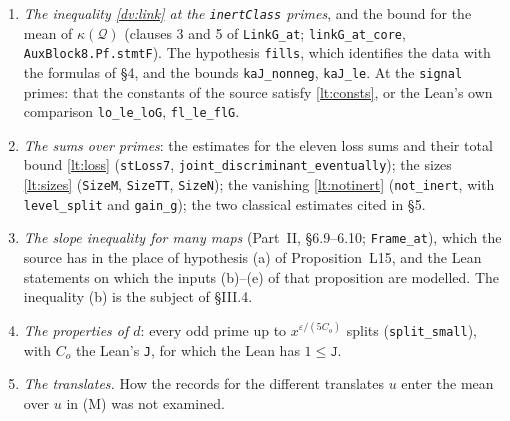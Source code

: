 \documentclass[11pt,letterpaper]{article}
\begin{document}
\begin{enumerate}[label=\textup{(\roman*)},leftmargin=2.4em]
the first clause of \texttt{LinkG\_at}; the last clause of \texttt{NuDef}, for the factor $e_w$;
\texttt{exists\_tau\_eq\_natCast} together with \texttt{fills}), and the definition \eqref{lt:N}
(\texttt{NprimeDef}). For the passage from \eqref{lt:slope} to the Lean statement \eqref{lt:Lo}: the rank
formula, the bound at the places above the level, the comparison with the first lattice of the chain
(\texttt{adm26}), the inequality of \texttt{HypLow2}, the bound $\sum_w\mathrm{sz}_w(\tau(w))\le b^2$
(\texttt{ta\_le}), and the bound for the rounding term. The last is the hypothesis \texttt{NprimeMuR} of
\texttt{places\_at\_of}; the source proves it by \texttt{linkMu} from \texttt{ZeroAbove}, from Chebyshev's
bound up to $X''$, and from bounds for $\log\mathrm{Lv}_\alpha$, $\log g_0$, $\log g_1$, $\log d$ and
$\log D_\alpha$ (\S2\,(c)), with the finite generation and the positivity of the ranks of the glued
lattices (\texttt{MuFG}, \texttt{MuRank}). That $\tau(w)=0$ above the level is the hypothesis \texttt{htauT}
of \texttt{places\_at\_of}. The archive also has a
statement \texttt{RoundingTheta}; it was not put to the dependency computation.
\item \emph{The inequality \eqref{dv:link} at the \texttt{inertClass} primes}, and the bound for the mean
of $\kappa(\mathcal Q)$ (clauses 3 and 5 of \texttt{LinkG\_at}; \texttt{linkG\_at\_core},
\texttt{AuxBlock8.Pf.stmtF}). The hypothesis \texttt{fills}, which identifies the data with the formulas of
\S4, and the bounds \texttt{kaJ\_nonneg}, \texttt{kaJ\_le}. At the \texttt{signal} primes: that the constants of the source satisfy
\eqref{lt:consts}, or the Lean's own comparison \texttt{lo\_le\_loG}, \texttt{fl\_le\_flG}.
\item \emph{The sums over primes}: the estimates for the eleven loss sums and their total bound
\eqref{lt:loss} (\texttt{stLoss7}, \texttt{joint\_discriminant\_eventually}); the sizes \eqref{lt:sizes} (\texttt{SizeM}, \texttt{SizeTT}, \texttt{SizeN});
the vanishing \eqref{lt:notinert} (\texttt{not\_inert}, with \texttt{level\_split} and \texttt{gain\_g}); the two classical estimates cited in \S5.
\item \emph{The slope inequality for many maps} (Part~II, \S6.9--6.10; \texttt{Frame\_at}), which the
source has in the place of hypothesis (a) of Proposition~L15, and the Lean statements on which the inputs
(b)--(e) of that proposition are modelled. The inequality (b) is the subject of \S III.4.
\item \emph{The properties of $d$}: every odd prime up to $x^{\varepsilon/(5C_o)}$ splits
(\texttt{split\_small}), with $C_o$ the Lean's \texttt{J}, for which the Lean has $1\le\mathtt J$.
\item \emph{The translates.} How the records for the different translates $u$ enter the mean over $u$ in
(M) was not examined.
\end{enumerate}
\end{document}
